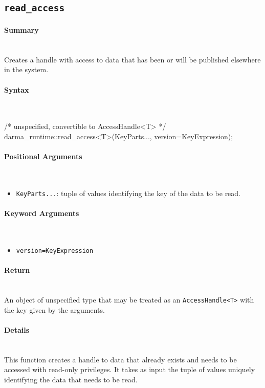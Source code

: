 \subsection{\texttt{read\_access}}

\paragraph{Summary}\mbox{}\\
Creates a handle with  access to data that has been or will be
published elsewhere in the system.

\paragraph{Syntax}\mbox{}\\
\begin{CppCode}
/* unspecified, convertible to AccessHandle<T> */
darma_runtime::read_access<T>(KeyParts..., version=KeyExpression);
\end{CppCode}

\paragraph{Positional Arguments}\mbox{}\\
\begin{itemize}
  \item \texttt{KeyParts...}: tuple of values identifying the key of the data to
  be read.
\end{itemize}

\paragraph{Keyword Arguments}\mbox{}\\
\begin{itemize}
  \item \texttt{version=KeyExpression} 
\end{itemize}


\paragraph{Return}\mbox{}\\
An object of unspecified type that may be treated as an \texttt{AccessHandle<T>}
with the key given by the arguments.

\paragraph{Details}\mbox{}\\
This function creates a handle to data that already exists and 
needs to be accessed with read-only privileges. 
It takes as input the tuple of values uniquely 
identifying the data that needs to be read.  

